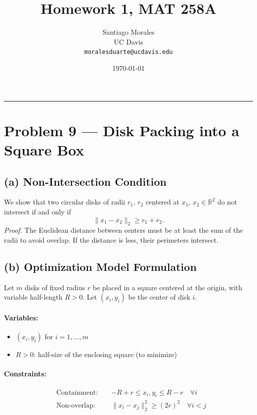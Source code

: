 \documentclass[11pt]{article}
\title{\vspace{-1cm} \textbf{Homework 1, MAT 258A}}
\author{Santiago Morales \\ UC Davis \\ \texttt{moralesduarte@ucdavis.edu}}
\date{\today}
\begin{document}
\maketitle
\vspace{-1em}
\hrule
\vspace{1em}

\section*{Problem 9 — Disk Packing into a Square Box}

\subsection*{(a) Non-Intersection Condition}

We show that two circular disks of radii $r_1$, $r_2$ centered at $x_1$, $x_2 \in \mathbb{R}^2$ do not intersect if and only if
\[
\|x_1 - x_2\|_2 \geq r_1 + r_2.
\]
\textit{Proof.} The Euclidean distance between centers must be at least the sum of the radii to avoid overlap. If the distance is less, their perimeters intersect.

\subsection*{(b) Optimization Model Formulation}

Let $m$ disks of fixed radius $r$ be placed in a square centered at the origin, with variable half-length $R > 0$. Let $(x_i, y_i)$ be the center of disk $i$.

\paragraph{Variables:}
\begin{itemize}[noitemsep]
    \item $(x_i, y_i)$ for $i = 1, \dots, m$
    \item $R > 0$: half-size of the enclosing square (to minimize)
\end{itemize}

\paragraph{Constraints:}
\begin{align*}
    & \text{Containment: } && -R + r \leq x_i, y_i \leq R - r \quad \forall i \\
    & \text{Non-overlap: } && \|x_i - x_j\|_2^2 \geq (2r)^2 \quad \forall i < j
\end{align*}
\end{document}
